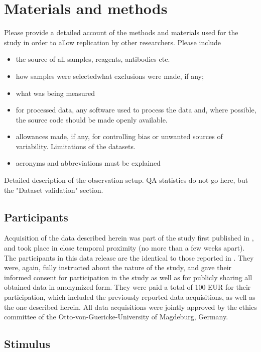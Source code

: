 \section*{Materials and methods} 
Please provide a detailed account of the methods and materials used for the study in order to allow replication by other researchers.
Please include \begin{itemize}
\item 
the source of all samples, reagents, antibodies etc.
\item 
 how samples were selectedwhat exclusions were made, if any;
\item 
what was being measured
\item 
for processed data, any software used to process the data and, where possible, the source code should be made openly available.\item 

allowances made, if any, for controlling bias or unwanted sources of variability.
Limitations of the datasets.\item 

acronyms and abbreviations must be explained
\end{itemize}

Detailed description of the observation setup. QA statistics do not go here, but the "Dataset validation" section.

\subsection*{Participants}
Acquisition of the data described herein was part of the study first published in \citet{Hanke_2014}, and took place in close temporal proximity (no more than a few weeks apart). The participants in this data release are the identical to those reported in \citet{Hanke_2014}.
They were, again, fully instructed about the nature of the study, and gave their informed consent for participation in the study as well as for publicly sharing all obtained data in anonymized form. They were paid a total of 100 EUR for their participation, which included the previously reported data acquisitions, as well as the one described herein. All data acquisitions were jointly approved by the ethics committee of the Otto-von-Guericke-University of Magdeburg, Germany.


\subsection*{Stimulus}

